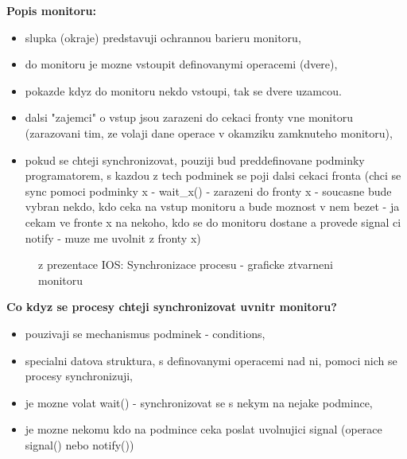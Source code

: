 \documentclass[a4paper, 11pt]{article}
\begin{document}
\textbf{Popis monitoru:}
\begin{itemize}
    \item slupka (okraje) predstavuji ochrannou barieru monitoru,
    \item do monitoru je mozne vstoupit definovanymi operacemi  (dvere),
    \item pokazde kdyz do monitoru nekdo vstoupi, tak se dvere uzamcou.
    \item dalsi "zajemci" o vstup jsou zarazeni do cekaci fronty vne monitoru (zarazovani tim, ze volaji dane operace v okamziku zamknuteho monitoru),
    \item pokud se chteji synchronizovat, pouziji bud preddefinovane podminky programatorem, s kazdou z tech podminek se poji dalsi cekaci fronta (chci se sync pomoci podminky x - wait\_x() - zarazeni do fronty x - soucasne bude vybran nekdo, kdo ceka na vstup monitoru a bude moznost v nem bezet - ja cekam ve fronte x na nekoho, kdo se do monitoru dostane a provede signal ci notify - muze me uvolnit z fronty x) \\
\end{itemize}

\begin{figure} [h]
    \centering
    \caption{z prezentace IOS: Synchronizace procesu - graficke ztvarneni monitoru}
\end{figure}

\textbf{Co kdyz se procesy chteji synchronizovat uvnitr monitoru?}
\begin{itemize}
    \item pouzivaji se mechanismus podminek - conditions,
    \item specialni datova struktura, s definovanymi operacemi nad ni, pomoci nich se procesy synchronizuji,
    \item je mozne volat wait() - synchronizovat se s nekym na nejake podmince,
    \item je mozne nekomu kdo na podmince ceka poslat uvolnujici signal (operace signal() nebo notify())
\end{itemize}
\end{document}
